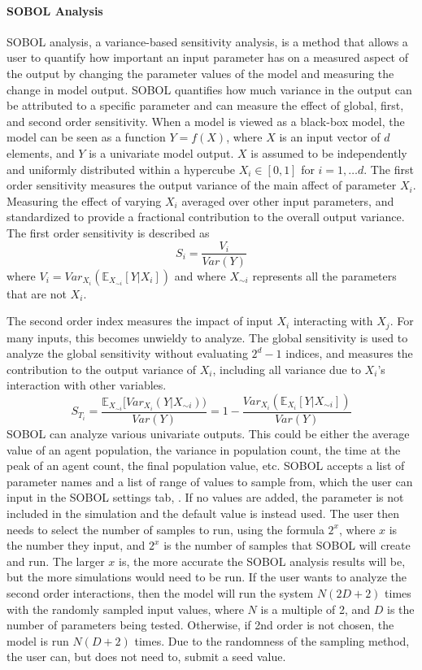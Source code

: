 \paragraph{SOBOL Analysis}
\label{sec:SOBOL_analysis}
SOBOL analysis, a variance-based sensitivity analysis, is a method that allows a user to quantify how important an input parameter has on a measured aspect of the output by changing the parameter values of the model and measuring the change in model output.
SOBOL quantifies how much variance in the output can be attributed to a specific parameter and can measure the effect of global, first, and second order sensitivity. 
When a model is viewed as a black-box model, the model can be seen as a function $Y=f(X)$, where $X$ is an input vector of $d$ elements, and $Y$ is a univariate model output.
$X$ is assumed to be independently and uniformly distributed within a hypercube $X_i \in [0, 1]$ for $i=1, \dots d$.
The first order sensitivity measures the output variance of the main affect of parameter $X_i$.
Measuring the effect of varying $X_i$ averaged over other input parameters, and standardized to provide a fractional contribution to the overall output variance.
The first order sensitivity is described as
\[
    S_i = \frac{V_i}{\textit{Var}(Y)}
\] where $V_i = \textit{Var}_{X_i}(\mathbb{E}_{X_{\sim i}}[Y|X_i])$ and where $X_{\sim i}$ represents all the parameters that are not $X_i$.

The second order index measures the impact of input $X_i$ interacting with $X_j$. For many inputs, this becomes unwieldy to analyze.
The global sensitivity is used to analyze the global sensitivity without evaluating $2^d-1$ indices, and measures the contribution to the output variance of $X_i$, including all variance due to $X_i$'s interaction with other variables.
\[
    S_{T_i} = \frac{\mathbb{E}_{X_{\sim i}}[\textit{Var}_{X_i}(Y|X_{\sim i}))}{\textit{Var}(Y)} = 1 - \frac{\textit{Var}_{X_i}(\mathbb{E}_{X_i}[Y|X_{\sim i}])}{\textit{Var}(Y)}
\]
SOBOL can analyze various univariate outputs.
This could be either the average value of an agent population, the variance in population count, the time at the peak of an agent count, the final population value, etc. \newline
SOBOL accepts a list of parameter names and a list of range of values to sample from, which the user can input in the SOBOL settings tab, . 
If no values are added, the parameter is not included in the simulation and the default value is instead used. 
The user then needs to select the number of samples to run, using the formula $2^x$, where $x$ is the number they input, and $2^x$ is the number of samples that SOBOL will create and run.
The larger $x$ is, the more accurate the SOBOL analysis results will be, but the more simulations would need to be run. \newline
If the user wants to analyze the second order interactions, then the model will run the system $N(2D+2)$ times with the randomly sampled input values, where $N$ is a multiple of 2, and $D$ is the number of parameters being tested.
Otherwise, if 2nd order is not chosen, the model is run $N(D+2)$ times.
Due to the randomness of the sampling method, the user can, but does not need to, submit a seed value. 


